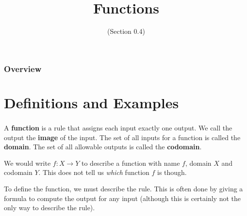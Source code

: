 \documentclass[11pt, compress]{beamer}
\title{Functions}
\subtitle{(Section 0.4)}
\author{}
\date{}
\newcommand{\terminology}[1]{\textbf{#1}}\newcommand{\lt}{<}
\begin{document}
\begin{frame}
\maketitle 
\end{frame}
 
\begin{frame}
\frametitle{Overview}
\tableofcontents 
\end{frame}
 

\section{Definitions and Examples}
\begin{frame}
\frametitle{}
A \terminology{function} is a rule that assigns each input exactly one output. We call the output the \terminology{image} of the input. The set of all inputs for a function is called the \terminology{domain}. The set of all allowable outputs is called the \terminology{codomain}.
 
\pause \vfill 

We would write \(f:X \to Y\) to describe a function with name \(f\), domain \(X\) and codomain \(Y\). This does not tell us \emph{which} function \(f\) is though.
 
\pause \vfill 

To define the function, we must describe the rule. This is often done by giving a formula to compute the output for any input (although this is certainly not the only way to describe the rule).
\end{frame}
 
\end{document}
